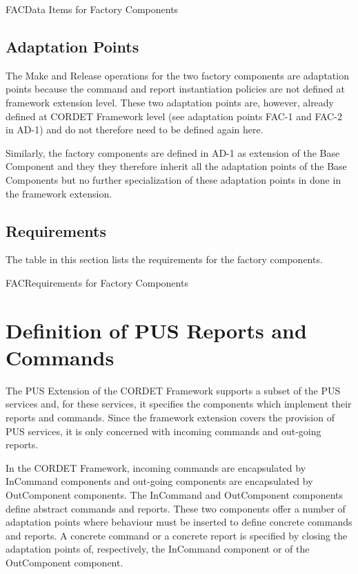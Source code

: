 \documentclass[a4paper,10pt]{article}
\let\stdsection\section
\renewcommand\section{\newpage\stdsection}
\newenvironment{cr_req}[2]
{
\begin{longtable}{|l|p{11.8cm}|}
\caption{#2}\label{tab:Req-#1} \\
\hline
\rowcolor{light-gray}
\textbf{Req. ID} & \textbf{Requirement Text}\\
\hline\hline
\endfirsthead
\rowcolor{light-gray}
\textbf{Req. ID} & \textbf{Requirement Text}\\
\hline\hline
\endhead
\DTLforeach*[\DTLiseq{\cat}{#1}]{dbReq}{\cat=Category,\type=Type,\id=Id,\reqText=Text}
{\DTLiffirstrow{}{\\\hline}P-\cat-\id/\type & \textit{\reqText}}\\\hline
}
{\end{longtable}}
\newenvironment{cr_obs}[2]
{
\begin{longtable}{|l|p{9.5cm}|}
\caption{#2}\label{tab:Obs-#1} \\
\hline
\rowcolor{light-gray}
\textbf{Name} & \textbf{Description}\\
\hline\hline
\endfirsthead
\rowcolor{light-gray}
\textbf{Name} & \textbf{Description}\\
\hline\hline
\endhead
\DTLforeach*[\DTLiseq{\cat}{#1}]{dbObs}{\cat=Category,\name=Name,\desc=Desc}
{\DTLiffirstrow{}{\\\hline}\texttt{\name} & \desc}\\\hline
}
{\end{longtable}}
\begin{document}
\begin{cr_obs}{FAC}{Data Items for Factory Components}
\end{cr_obs}

\subsection{Adaptation Points}
The Make and Release operations for the two factory components are adaptation points because the command and report instantiation policies are not defined at framework extension level. These two adaptation points are, however, already defined at CORDET Framework level (see adaptation points FAC-1 and FAC-2 in AD-1) and do not therefore need to be defined again here.

Similarly, the factory components are defined in AD-1 as extension of the Base Component and they they therefore inherit all the adaptation points of the Base Components but no further specialization of these adaptation points in done in the framework extension.

\subsection{Requirements}
The table in this section lists the requirements for the factory components.

\begin{cr_req}{FAC}{Requirements for Factory Components}
\end{cr_req}


\section{Definition of PUS Reports and Commands}\label{sec:defPusRepCmd}
The PUS Extension of the CORDET Framework supports a subset of the PUS services and, for these services, it specifies the components which implement their reports and commands. Since the framework extension covers the provision of PUS services, it is only concerned with incoming commands and out-going reports. 

In the CORDET Framework, incoming commands are encapsulated by InCommand components and out-going components are encapsulated by OutComponent components. The InCommand and OutComponent components define abstract commands and reports. These two components offer a number of adaptation points where behaviour must be inserted to define concrete commands and reports. A concrete command or a concrete report is specified by closing the adaptation points of, respectively, the InCommand component or of the OutComponent component. 
\end{document}
